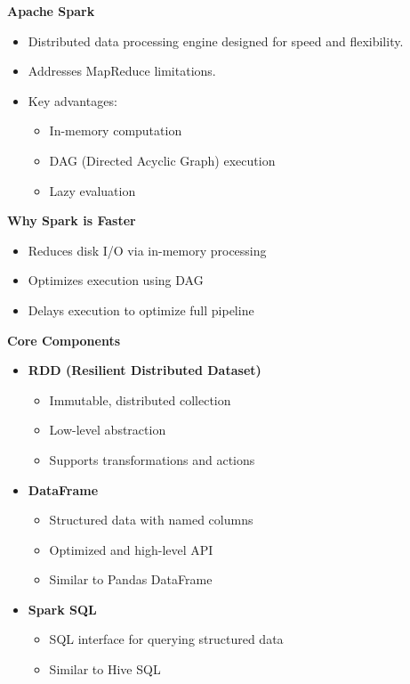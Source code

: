 \documentclass[10pt,a4paper]{article}
\begin{document}
	\textbf{Apache Spark}
	\begin{itemize}
	    \item Distributed data processing engine designed for speed and flexibility.
	    \item Addresses MapReduce limitations.
	    \item Key advantages:
	    \begin{itemize}
	        \item In-memory computation
	        \item DAG (Directed Acyclic Graph) execution
	        \item Lazy evaluation
	    \end{itemize}
	\end{itemize}
	
	\textbf{Why Spark is Faster}
	\begin{itemize}
	    \item Reduces disk I/O via in-memory processing
	    \item Optimizes execution using DAG
	    \item Delays execution to optimize full pipeline
	\end{itemize}
	
	\textbf{Core Components}
	\begin{itemize}
	    \item \textbf{RDD (Resilient Distributed Dataset)}
	    \begin{itemize}
	        \item Immutable, distributed collection
	        \item Low-level abstraction
	        \item Supports transformations and actions
	    \end{itemize}
	    
	    \item \textbf{DataFrame}
	    \begin{itemize}
	        \item Structured data with named columns
	        \item Optimized and high-level API
	        \item Similar to Pandas DataFrame
	    \end{itemize}
	    
	    \item \textbf{Spark SQL}
	    \begin{itemize}
	        \item SQL interface for querying structured data
	        \item Similar to Hive SQL
	    \end{itemize}
	\end{itemize}
	
\end{document}
